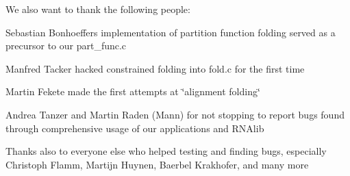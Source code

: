 We also want to thank the following people\+:


\begin{DoxyItemize}
\item Sebastian Bonhoeffer\textquotesingle{}s implementation of partition function folding served as a precursor to our part\+\_\+func.\+c
\item Manfred Tacker hacked constrained folding into fold.\+c for the first time
\item Martin Fekete made the first attempts at \char`\"{}alignment folding\char`\"{}
\item Andrea Tanzer and Martin Raden (Mann) for not stopping to report bugs found through comprehensive usage of our applications and R\+N\+Alib
\item Thanks also to everyone else who helped testing and finding bugs, especially Christoph Flamm, Martijn Huynen, Baerbel Krakhofer, and many more 
\end{DoxyItemize}

 
